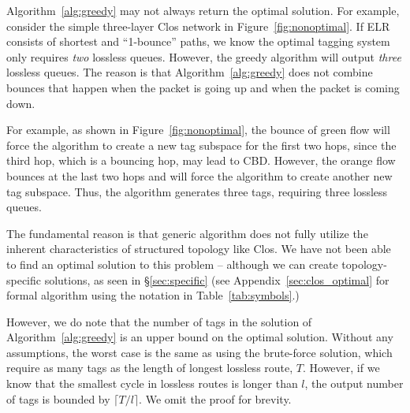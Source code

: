 Algorithm~\ref{alg:greedy} may not always return the optimal solution. For example,
consider the simple three-layer Clos network in Figure~\ref{fig:nonoptimal}.
If ELR consists of shortest and ``1-bounce'' paths,
we know the optimal tagging system only requires {\em two} lossless queues. However, the
greedy algorithm will output {\em three} lossless queues. The reason is that
Algorithm~\ref{alg:greedy} does not combine bounces that happen when the packet is going up
and when the packet is coming down.

For example, as shown in Figure~\ref{fig:nonoptimal}, the bounce of green flow
will force the algorithm to create a new tag subspace for the first two hops,
since the third hop, which is a bouncing hop, may lead to CBD.  However, the
orange flow bounces at the last two hops and will force the algorithm to create
another new tag subspace. Thus, the algorithm generates three tags, requiring
three lossless queues.

The fundamental reason is that generic algorithm does not fully utilize the
inherent characteristics of structured topology like Clos. We have not been able
to find an optimal solution to this problem -- although we can create
topology-specific solutions, as seen in \S\ref{sec:specific} (see
Appendix~\ref{sec:clos_optimal} for formal algorithm using the notation in
Table~\ref{tab:symbols}.)

However, we do note that the number of tags in the solution of
Algorithm~\ref{alg:greedy} is an upper bound on the optimal solution.  Without
any assumptions, the worst case is the same as using the brute-force solution,
which require as many tags as the length of longest lossless route, $T$.
However, if we know that the smallest cycle in lossless routes is longer than
$l$, the output number of tags is bounded by $\lceil T/l \rceil$. We omit the
proof for brevity.

